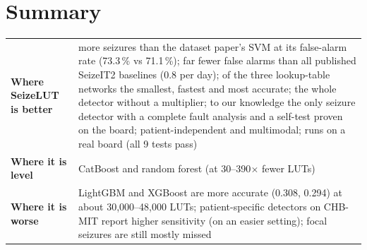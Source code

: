 \documentclass[10pt,a4paper,landscape]{article}
\begin{document}
\section*{Summary}
\begin{tabularx}{\textwidth}{@{}P{55mm}L@{}}
\toprule
\textbf{Where SeizeLUT is better} & more seizures than the dataset paper's SVM at its false-alarm rate (73.3\,\% vs 71.1\,\%);
far fewer false alarms than all published SeizeIT2 baselines (0.8 per day); of the three lookup-table networks the smallest, fastest and most accurate; the whole detector without a multiplier; to our knowledge the only seizure detector with a complete fault analysis
and a self-test proven on the board; patient-independent and multimodal; runs on a real board (all 9 tests pass)\\
\textbf{Where it is level} & CatBoost and random forest (at 30--390$\times$ fewer LUTs)\\
\textbf{Where it is worse} & LightGBM and XGBoost are more accurate (0.308, 0.294) at about 30,000--48,000 LUTs; patient-specific
detectors on CHB-MIT report higher sensitivity (on an easier setting); focal seizures are still mostly missed\\
\bottomrule
\end{tabularx}

{\footnotesize}
\end{document}
